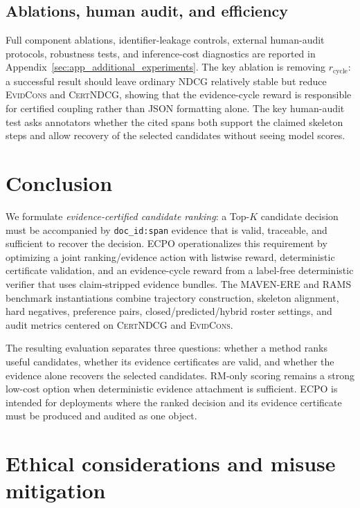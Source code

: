 \documentclass{article}
\newcommand{\CertNDCG}{\textsc{CertNDCG}}
\newcommand{\EvidCons}{\textsc{EvidCons}}
\begin{document}
\subsection{Ablations, human audit, and efficiency}
\label{sec:exp_ablation}
Full component ablations, identifier-leakage controls, external human-audit protocols, robustness tests, and inference-cost diagnostics are reported in Appendix~\ref{sec:app_additional_experiments}. The key ablation is removing $r_{\mathrm{cycle}}$: a successful result should leave ordinary NDCG relatively stable but reduce \EvidCons{} and \CertNDCG{}, showing that the evidence-cycle reward is responsible for certified coupling rather than JSON formatting alone. The key human-audit test asks annotators whether the cited spans both support the claimed skeleton steps and allow recovery of the selected candidates without seeing model scores.

\section{Conclusion}
\label{sec:conclusion}

We formulate \emph{evidence-certified candidate ranking}: a Top-$K$ candidate decision must be accompanied by \texttt{doc\_id:span} evidence that is valid, traceable, and sufficient to recover the decision. ECPO operationalizes this requirement by optimizing a joint ranking/evidence action with listwise reward, deterministic certificate validation, and an evidence-cycle reward from a label-free deterministic verifier that uses claim-stripped evidence bundles. The MAVEN-ERE and RAMS benchmark instantiations combine trajectory construction, skeleton alignment, hard negatives, preference pairs, closed/predicted/hybrid roster settings, and audit metrics centered on \CertNDCG{} and \EvidCons{}.

The resulting evaluation separates three questions: whether a method ranks useful candidates, whether its evidence certificates are valid, and whether the evidence alone recovers the selected candidates. RM-only scoring remains a strong low-cost option when deterministic evidence attachment is sufficient. ECPO is intended for deployments where the ranked decision and its evidence certificate must be produced and audited as one object.

\section{Ethical considerations and misuse mitigation}
\label{sec:ethics}
\end{document}
